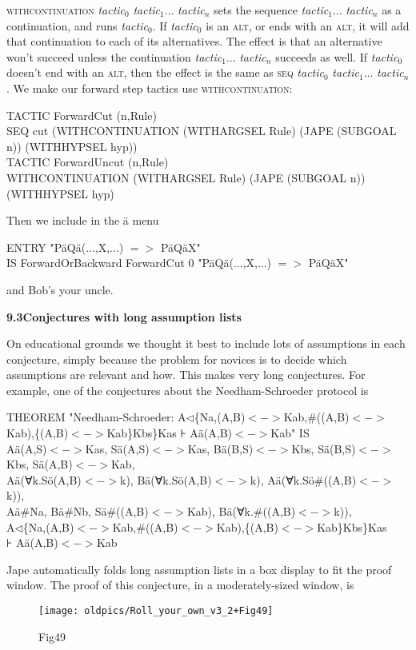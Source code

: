 \textsc{withcontinuation} \textit{tactic}$_{0}$ \textit{tactic}$_{1}$... \textit{tactic}$_{\textit{n}}$ sets the sequence \textit{tactic}$_{1}$... \textit{tactic}$_{\textit{n}}$ as a continuation, and runs \textit{tactic}$_{0}$. If \textit{tactic}$_{0}$ is an \textsc{alt}, or ends with an \textsc{alt}, it will add that continuation to each of its alternatives. The effect is that an alternative won't succeed unless the continuation \textit{tactic}$_{1}$... \textit{tactic}$_{\textit{n}}$ succeeds as well. If \textit{tactic}$_{0}$ doesn't end with an \textsc{alt}, then the effect is the same as \textsc{seq} \textit{tactic}$_{0}$ \textit{tactic}$_{1}$... \textit{tactic}$_{\textit{n}}$. We make our forward step tactics use \textsc{withcontinuation}:

TACTIC ForwardCut (n,Rule)\\
\tab SEQ cut (WITHCONTINUATION (WITHARGSEL Rule) (JAPE (SUBGOAL n)) (WITHHYPSEL hyp))\\
TACTIC ForwardUncut (n,Rule)\\
\tab WITHCONTINUATION (WITHARGSEL Rule) (JAPE (SUBGOAL n)) (WITHHYPSEL hyp)


Then we include in the \"{a} menu

ENTRY "P\"{a}Q\"{a}(...,X,...) $=>$ P\"{a}Q\"{a}X"\\
\tab IS ForwardOrBackward ForwardCut 0 "P\"{a}Q\"{a}(...,X,...) $=>$ P\"{a}Q\"{a}X"


and Bob's your uncle.


\textbf{{\large 9.3\tab Conjectures with long assumption lists}}


On educational grounds we thought it best to include lots of assumptions in each conjecture, simply because the problem for novices is to decide which assumptions are relevant and how. This makes very long conjectures. For example, one of the conjectures about the Needham-Schroeder protocol is

{\small THEOREM "Needham-Schroeder: A$\triangleleft$\{Na,(A,B)$<->$Kab,\#((A,B)$<->$Kab),\{(A,B)$<->$Kab\}Kbs\}Kas ⊦ A\"{a}(A,B)$<->$Kab" IS  \\
\tab \tab A\"{a}(A,S)$<->$Kas, S\"{a}(A,S)$<->$Kas, B\"{a}(B,S)$<->$Kbs, S\"{a}(B,S)$<->$Kbs, S\"{a}(A,B)$<->$Kab,\\
\tab \tab A\"{a}(∀k.S\"{o}(A,B)$<->$k), B\"{a}(∀k.S\"{o}(A,B)$<->$k), A\"{a}(∀k.S\"{o}\#((A,B)$<->$k)), \\
\tab \tab A\"{a}\#Na, B\"{a}\#Nb, S\"{a}\#((A,B)$<->$Kab), B\"{a}(∀k.\#((A,B)$<->$k)), \\
\tab \tab A$\triangleleft$\{Na,(A,B)$<->$Kab,\#((A,B)$<->$Kab),\{(A,B)$<->$Kab\}Kbs\}Kas \\
\tab \tab ⊦ A\"{a}(A,B)$<->$Kab}


Jape automatically folds long assumption lists in a box display to fit the proof window. The proof of this conjecture, in a moderately-sized window, is

\begin{figure}[htbp] \begin{center} \texttt{[image: oldpics/Roll\_your\_own\_v3\_2+Fig49]} \caption{Fig49} \end{center} \end{figure}

 